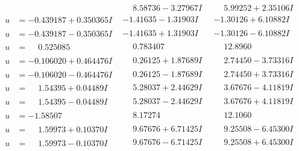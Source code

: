 \documentclass[1p]{elsarticle_modified}
\theoremstyle{definition}
\begin{document}
$$\begin{array}{c|c|c}
 & \phantom{-}8.58736 - 3.27967 I & \phantom{-}5.99252 + 2.35106 I \\ \hline\begin{aligned}
u &= -0.439187 + 0.350365 I\end{aligned}
 & -1.41635 - 1.31903 I & -1.30126 + 6.10882 I \\ \hline\begin{aligned}
u &= -0.439187 - 0.350365 I\end{aligned}
 & -1.41635 + 1.31903 I & -1.30126 - 6.10882 I \\ \hline\begin{aligned}
u &= \phantom{-}0.525085\phantom{ +0.000000I}\end{aligned}
 & \phantom{-}0.783407\phantom{ +0.000000I} & \phantom{-}12.8960\phantom{ +0.000000I} \\ \hline\begin{aligned}
u &= -0.106020 + 0.464476 I\end{aligned}
 & \phantom{-}0.26125 + 1.87689 I & \phantom{-}2.74450 - 3.73316 I \\ \hline\begin{aligned}
u &= -0.106020 - 0.464476 I\end{aligned}
 & \phantom{-}0.26125 - 1.87689 I & \phantom{-}2.74450 + 3.73316 I \\ \hline\begin{aligned}
u &= \phantom{-}1.54395 + 0.04489 I\end{aligned}
 & \phantom{-}5.28037 + 2.44629 I & \phantom{-}3.67676 - 4.11819 I \\ \hline\begin{aligned}
u &= \phantom{-}1.54395 - 0.04489 I\end{aligned}
 & \phantom{-}5.28037 - 2.44629 I & \phantom{-}3.67676 + 4.11819 I \\ \hline\begin{aligned}
u &= -1.58507\phantom{ +0.000000I}\end{aligned}
 & \phantom{-}8.17274\phantom{ +0.000000I} & \phantom{-}12.1060\phantom{ +0.000000I} \\ \hline\begin{aligned}
u &= \phantom{-}1.59973 + 0.10370 I\end{aligned}
 & \phantom{-}9.67676 + 6.71425 I & \phantom{-}9.25508 - 6.45300 I \\ \hline\begin{aligned}
u &= \phantom{-}1.59973 - 0.10370 I\end{aligned}
 & \phantom{-}9.67676 - 6.71425 I & \phantom{-}9.25508 + 6.45300 I \\ \hline\begin{aligned}

\end{aligned}
\end{array}$$
\end{document}
